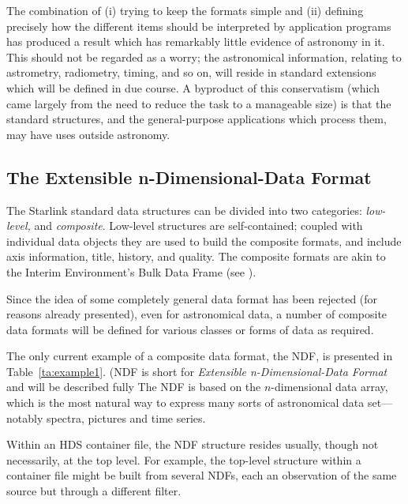 \documentclass[twoside,11pt,nolof,noabs]{starlink}
\begin{document}
The combination of (i) trying to keep the formats simple and
(ii) defining precisely how the different items should be
interpreted by application programs has produced a result
which has remarkably little evidence of astronomy in it.  This
should not be regarded as a worry;  the astronomical
information, relating to astrometry, radiometry, timing,
and so on, will reside in standard extensions which will be defined
in due course.  A byproduct of this conservatism (which
came largely from the need to reduce the task to a
manageable size) is that the standard structures, and
the general-purpose applications which process them, may have uses
outside astronomy.

\subsection*{The Extensible n-Dimensional-Data Format}
The Starlink standard data structures can be divided into two
categories:
\textit{low-level,} and \textit{composite}.  Low-level structures are
self-contained; coupled with
individual data objects they are used to build the composite
formats, and include axis information, title, history, and quality.
The composite formats are akin to the Interim
Environment's Bulk Data Frame (see ).

Since the idea of some completely general data format has
been rejected (for reasons already presented), even for
astronomical data, a number of composite data formats will be
defined for various classes or forms of data as required.

The only current example of a composite data format, the NDF, is
presented in Table~\ref{ta:example1}.  (NDF is short for \textit{Extensible n-Dimensional-Data Format} and will be described fully
  The
NDF is based on the $n$-dimensional data array, which is the most
natural way to express many sorts of astronomical data set---notably
spectra, pictures and time series.

Within an HDS container file, the NDF structure resides usually,
though not necessarily, at the top level.  For example, the top-level
structure within a container file might be built from several NDFs,
each an observation of the same source but through a different filter.
\end{document}
